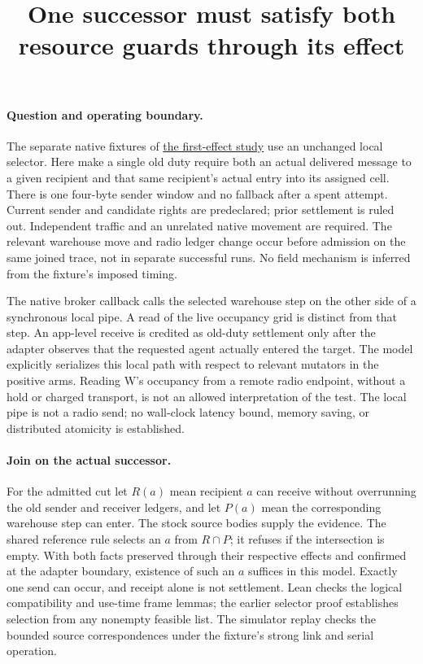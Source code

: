 \documentclass{article}
\title{One successor must satisfy both resource guards through its effect}
\author{}
\date{}
\begin{document}
\maketitle
\paragraph{Question and operating boundary.}
The separate native fixtures of \href{https://github.com/eternal-november/eos-research-programmes/pull/811}{the first-effect study}
use an unchanged local selector. Here make a single old duty require
both an actual delivered message to a given recipient and that same
recipient's actual entry into its assigned cell. There is one
four-byte sender window and no fallback after a spent attempt. Current
sender and candidate rights are predeclared; prior settlement is ruled
out. Independent traffic and an unrelated native movement are required.
The relevant warehouse move and radio ledger change occur before
admission on the same joined trace, not in separate successful runs.
No field mechanism is inferred from the fixture's imposed timing.

The native broker callback calls the selected warehouse step on the
other side of a synchronous local pipe. A read of the live occupancy
grid is distinct from that step. An app-level receive is credited as
old-duty settlement only after the adapter observes that the requested
agent actually entered the target. The model explicitly serializes
this local path with respect to relevant mutators in the positive
arms. Reading W's occupancy from a remote radio endpoint, without a hold
or charged transport, is not an allowed interpretation of the test.
The local pipe is not a radio send; no wall-clock latency bound,
memory saving, or distributed atomicity is established.

\paragraph{Join on the actual successor.}
For the admitted cut let $R(a)$ mean recipient $a$ can receive without
overrunning the old sender and receiver ledgers, and let $P(a)$ mean
the corresponding warehouse step can enter. The stock source bodies
supply the evidence. The shared reference rule selects an $a$ from
$R\cap P$; it refuses if the intersection is empty. With both facts
preserved through their respective effects and confirmed at the
adapter boundary, existence of such an $a$ suffices in this model.
Exactly one send can occur, and receipt alone is not settlement.
Lean checks the logical compatibility and use-time frame lemmas;
the earlier selector proof establishes selection from any nonempty
feasible list. The simulator replay checks the bounded source
correspondences under the fixture's strong link and serial operation.
\end{document}
